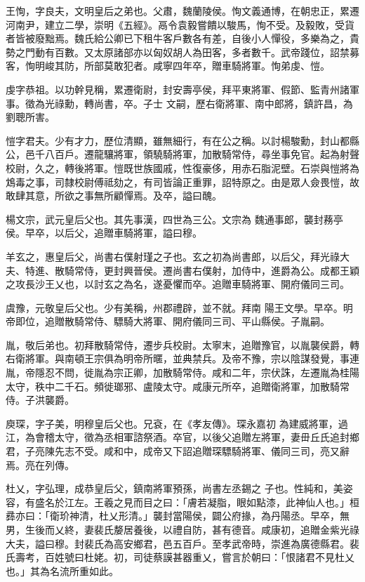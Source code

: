 \begin{pinyinscope}
 王恂，字良夫，文明皇后之弟也。父肅，魏蘭陵侯。恂文義通博，在朝忠正，累遷河南尹，建立二學，崇明《五經》。鬲令袁毅嘗饋以駿馬，恂不受。及毅敗，受貨者皆被廢黜焉。魏氏給公卿已下租牛客戶數各有差，自後小人憚役，多樂為之，貴勢之門動有百數。又太原諸部亦以匈奴胡人為田客，多者數千。武帝踐位，詔禁募客，恂明峻其防，所部莫敢犯者。咸寧四年卒，贈車騎將軍。恂弟虔、愷。



 虔字恭祖。以功幹見稱，累遷衛尉，封安壽亭侯，拜平東將軍、假節、監青州諸軍事。徵為光祿勳，轉尚書，卒。子士
 文嗣，歷右衛將軍、南中郎將，鎮許昌，為劉聰所害。



 愷字君夫。少有才力，歷位清顯，雖無細行，有在公之稱。以討楊駿勳，封山都縣公，邑千八百戶。遷龍驤將軍，領驍騎將軍，加散騎常侍，尋坐事免官。起為射聲校尉，久之，轉後將軍。愷既世族國戚，性復豪侈，用赤石脂泥壁。石崇與愷將為鴆毒之事，司隸校尉傅祗劾之，有司皆論正重罪，詔特原之。由是眾人僉畏愷，故敢肆其意，所欲之事無所顧憚焉。及卒，謚曰醜。



 楊文宗，武元皇后父也。其先事漢，四世為三公。文宗為
 魏通事郎，襲封蓩亭侯。早卒，以后父，追贈車騎將軍，謚曰穆。



 羊玄之，惠皇后父，尚書右僕射瑾之子也。玄之初為尚書郎，以后父，拜光祿大夫、特進、散騎常侍，更封興晉侯。遷尚書右僕射，加侍中，進爵為公。成都王穎之攻長沙王乂也，以討玄之為名，遂憂懼而卒。追贈車騎將軍、開府儀同三司。



 虞豫，元敬皇后父也。少有美稱，州郡禮辟，並不就。拜南
 陽王文學。早卒。明帝即位，追贈散騎常侍、驃騎大將軍、開府儀同三司、平山縣侯。子胤嗣。



 胤，敬后弟也。初拜散騎常侍，遷步兵校尉。太寧末，追贈豫官，以胤襲侯爵，轉右衛將軍。與南頓王宗俱為明帝所暱，並典禁兵。及帝不豫，宗以陰謀發覺，事連胤，帝隱忍不問，徙胤為宗正卿，加散騎常侍。咸和二年，宗伏誅，左遷胤為桂陽太守，秩中二千石。頻徙瑯邪、盧陵太守。咸康元所卒，追贈衛將軍，加散騎常侍。子洪襲爵。



 庾琛，字子美，明穆皇后父也。兄袞，在《孝友傳》。琛永嘉初
 為建威將軍，過江，為會稽太守，徵為丞相軍諮祭酒。卒官，以後父追贈左將軍，妻毌丘氏追封鄉君，子亮陳先志不受。咸和中，成帝又下詔追贈琛驃騎將軍、儀同三司，亮又辭焉。亮在列傳。



 杜乂，字弘理，成恭皇后父，鎮南將軍預孫，尚書左丞錫之
 子也。性純和，美姿容，有盛名於江左。王羲之見而目之曰：「膚若凝脂，眼如點漆，此神仙人也。」桓彞亦曰：「衛玠神清，杜乂形清。」襲封當陽侯，闢公府掾，為丹陽丞。早卒，無男，生後而乂終，妻裴氏嫠居養後，以禮自防，甚有德音。咸康初，追贈金紫光祿大夫，謚曰穆。封裴氏為高安鄉君，邑五百戶。至孝武帝時，崇進為廣德縣君。裴氏壽考，百姓號曰杜姥。初，司徒蔡謨甚器重乂，嘗言於朝曰：「恨諸君不見杜乂也。」其為名流所重如此。




\end{pinyinscope}
